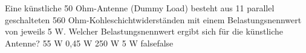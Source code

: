     {Eine künstliche 50 Ohm-Antenne (Dummy Load) besteht aus 11 parallel geschalteten 560 Ohm-Kohleschichtwiderständen mit einem Belastungsnennwert von jeweils 5 W. Welcher Belastungsnennwert ergibt sich für die künstliche Antenne?}
    {55 W}
    {0,45 W}
    {250 W}
    {5 W}
    {false}{false}